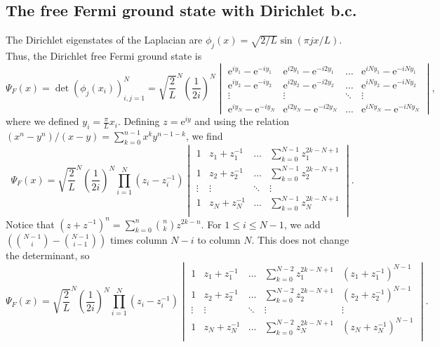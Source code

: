 \documentclass[a4paper,11pt]{article}
\newcommand{\euler}[1]{\text{e}^{#1}}
\numberwithin{equation}{section}
\begin{document}
	\subsection{The free Fermi ground state with Dirichlet b.c.}
	\label{secfreefermi}
	The Dirichlet eigenstates of the Laplacian are $ \phi_j(x)=\sqrt{2/L}\sin(\pi j x/L) $. Thus, the Dirichlet free Fermi ground state is \begin{equation}
	\Psi_F(x)=\det\left(\phi_j(x_i)\right)_{i,j=1}^{N}=\sqrt{\frac{2}{L}}^N\left(\frac{1}{2i}\right)^N\begin{vmatrix}
	\euler{iy_1}-\euler{-iy_1}&\euler{i2y_1}-\euler{-i2y_1}&\ldots&\euler{iNy_1}-\euler{-iNy_1}\\
	\euler{iy_2}-\euler{-iy_2}&\euler{i2y_2}-\euler{-i2y_2}&\ldots&\euler{iNy_2}-\euler{-iNy_2}\\
	\vdots&\vdots&\ddots&\vdots\\
	\euler{iy_N}-\euler{-iy_N}&\euler{i2y_N}-\euler{-i2y_N}&\ldots&\euler{iNy_N}-\euler{-iNy_N}
	\end{vmatrix},
	\end{equation}
	where we defined $ y_i=\frac{\pi}{L}x_i$. Defining $ z=\euler{iy} $ and using the relation $ (x^n-y^n)/(x-y)=\sum_{k=0}^{n-1}x^ky^{n-1-k} $, we find\begin{equation}
	\Psi_F(x)=\sqrt{\frac{2}{L}}^N\left(\frac{1}{2i}\right)^N\prod_{i=1}^{N}(z_i-z_i^{-1})\begin{vmatrix}
	1&z_1+z_1^{-1}&\ldots&\sum_{k=0}^{N-1}z_1^{2k-N+1}\\
	1&z_2+z_2^{-1}&\ldots&\sum_{k=0}^{N-1}z_2^{2k-N+1}\\
	\vdots&\vdots&\ddots&\vdots\\
	1&z_N+z_N^{-1}&\ldots&\sum_{k=0}^{N-1}z_N^{2k-N+1}\\
	\end{vmatrix}.
	\end{equation}
	Notice that $ (z+z^{-1})^n=\sum_{k=0}^{n}\binom{n}{k}z^{2k-n} $.
	For $1\leq i\leq N-1$, we add $ \left(\binom{N-1}{i}-\binom{N-1}{i-1}\right) $ times column $ N-i $ to column $ N $. This does not change the determinant, so \begin{equation}
	\Psi_F(x)=\sqrt{\frac{2}{L}}^N\left(\frac{1}{2i}\right)^N\prod_{i=1}^{N}(z_i-z_i^{-1})\begin{vmatrix}
	1&z_1+z_1^{-1}&\ldots&\sum_{k=0}^{N-2}z_1^{2k-N+1}&(z_1+z_1^{-1})^{N-1}\\
	1&z_2+z_2^{-1}&\ldots&\sum_{k=0}^{N-2}z_2^{2k-N+1}&(z_2+z_2^{-1})^{N-1}\\
	\vdots&\vdots&\ddots&\vdots&\vdots\\
	1&z_N+z_N^{-1}&\ldots&\sum_{k=0}^{N-2}z_N^{2k-N+1}&(z_N+z_N^{-1})^{N-1}\\
	\end{vmatrix}.
	\end{equation}
\end{document}
